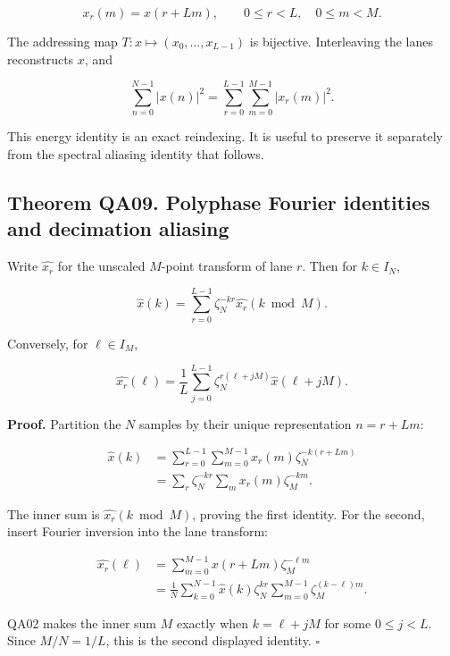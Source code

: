 \[
x_r(m)=x(r+Lm),
\qquad 0\le r<L,\quad 0\le m<M.
\]

The addressing map \(T:x\mapsto(x_0,\ldots,x_{L-1})\) is bijective.
Interleaving the lanes reconstructs \(x\), and

\[
\sum_{n=0}^{N-1}|x(n)|^2
=\sum_{r=0}^{L-1}\sum_{m=0}^{M-1}|x_r(m)|^2.
\]

This energy identity is an exact reindexing. It is useful to preserve it
separately from the spectral aliasing identity that follows.

\hypertarget{q:theorem-qa09.-polyphase-fourier-identities-and-decimation-aliasing}{%
\subsection*{Theorem QA09. Polyphase Fourier identities and decimation
aliasing}\label{q:theorem-qa09.-polyphase-fourier-identities-and-decimation-aliasing}}

Write \(\widehat{x_r}\) for the unscaled \(M\)-point transform of lane
\(r\). Then for \(k\in I_N\),

\[
\boxed{\widehat{x}(k)
=\sum_{r=0}^{L-1}\zeta_N^{-kr}\widehat{x_r}(k\bmod M).}
\]

Conversely, for \(\ell\in I_M\),

\[
\boxed{\widehat{x_r}(\ell)
=\frac1L\sum_{j=0}^{L-1}
\zeta_N^{r(\ell+jM)}\widehat{x}(\ell+jM).}
\]

\textbf{Proof.} Partition the \(N\) samples by their unique
representation \(n=r+Lm\):

\[
\begin{aligned}
\widehat{x}(k)
&=\sum_{r=0}^{L-1}\sum_{m=0}^{M-1}
x_r(m)\zeta_N^{-k(r+Lm)}\\
&=\sum_r\zeta_N^{-kr}\sum_mx_r(m)\zeta_M^{-km}.
\end{aligned}
\]

The inner sum is \(\widehat{x_r}(k\bmod M)\), proving the first
identity. For the second, insert Fourier inversion into the lane
transform:

\[
\begin{aligned}
\widehat{x_r}(\ell)
&=\sum_{m=0}^{M-1}x(r+Lm)\zeta_M^{-\ell m}\\
&=\frac1N\sum_{k=0}^{N-1}\widehat{x}(k)\zeta_N^{kr}
\sum_{m=0}^{M-1}\zeta_M^{(k-\ell)m}.
\end{aligned}
\]

QA02 makes the inner sum \(M\) exactly when \(k=\ell+jM\) for some
\(0\le j<L\). Since \(M/N=1/L\), this is the second displayed identity.
\(\square\)


